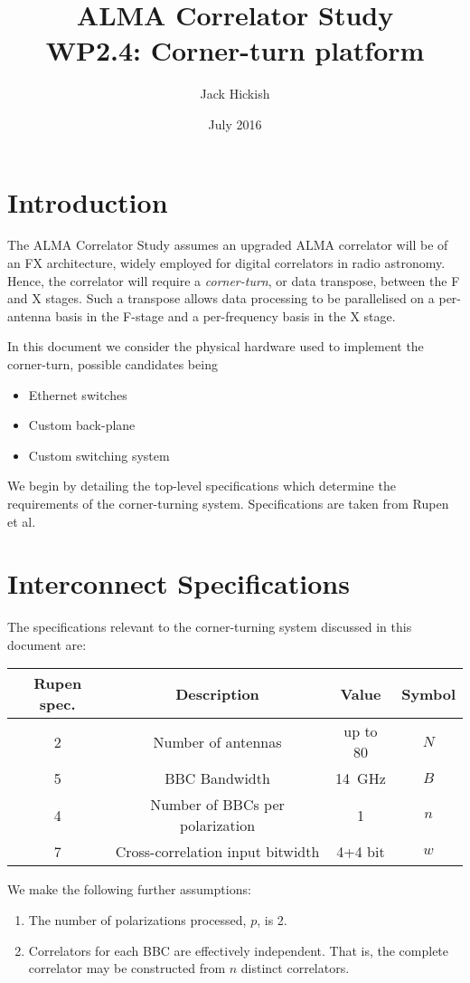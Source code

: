 \documentclass{article}
\title{ALMA Correlator Study\\ WP2.4: Corner-turn platform}
\author{Jack Hickish}
\date{July 2016}
\begin{document}
\maketitle

\section{Introduction}
The ALMA Correlator Study assumes an upgraded ALMA correlator will be of an FX architecture, widely employed for digital correlators in radio astronomy.
Hence, the correlator will require a \emph{corner-turn}, or data transpose, between the F and X stages. Such a transpose allows data processing to be parallelised on a per-antenna basis in the F-stage and a per-frequency basis in the X stage.

In this document we consider the physical hardware used to implement the corner-turn, possible candidates being
\begin{itemize}
    \item Ethernet switches
    \item Custom back-plane
    \item Custom switching system
\end{itemize}

We begin by detailing the top-level specifications which determine the requirements of the corner-turning system. Specifications are taken from Rupen et al.

\section{Interconnect Specifications}
The specifications relevant to the corner-turning system discussed in this document are:

\begin{center}
\begin{tabular}{ c c c c }
 Rupen spec. & Description & Value & Symbol \\
 \hline
 2 & Number of antennas & up to 80 & $N$ \\
 5 & BBC Bandwidth & 14~GHz & $B$ \\
 4 & Number of BBCs per polarization & 1 & $n$ \\
 7 & Cross-correlation input bitwidth & 4+4 bit & $w$ \\
\end{tabular}
\end{center}

We make the following further assumptions:
\begin{enumerate}
\item The number of polarizations processed, $p$, is 2.
\item Correlators for each BBC are effectively independent. That is, the complete correlator may be constructed from $n$ distinct correlators.
\end{enumerate}
\end{document}
